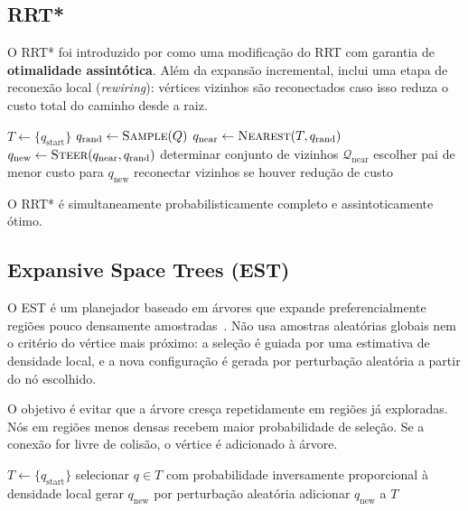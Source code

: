 \subsection{RRT*}

O RRT* foi introduzido por \citet{Karaman2011SamplingbasedAF} como uma modificação do RRT com garantia de \textbf{otimalidade assintótica}. Além da expansão incremental, inclui uma etapa de reconexão local (\textit{rewiring}): vértices vizinhos são reconectados caso isso reduza o custo total do caminho desde a raiz.

\begin{algorithm}[H]
\caption{RRT*}
\begin{algorithmic}[1]
\State $T \gets \{q_{\mathrm{start}}\}$
    \State $q_{\mathrm{rand}} \gets \textsc{Sample}(Q)$
    \State $q_{\mathrm{near}} \gets \textsc{Nearest}(T, q_{\mathrm{rand}})$
    \State $q_{\mathrm{new}} \gets \textsc{Steer}(q_{\mathrm{near}}, q_{\mathrm{rand}})$
        \State determinar conjunto de vizinhos $\mathcal{Q}_{\mathrm{near}}$
        \State escolher pai de menor custo para $q_{\mathrm{new}}$
        \State reconectar vizinhos se houver redução de custo
    \EndIf
\EndWhile
\end{algorithmic}
\end{algorithm}

O RRT* é simultaneamente probabilisticamente completo e assintoticamente ótimo.

\subsection{Expansive Space Trees (EST)}
\label{subsec:est}

O EST é um planejador baseado em árvores que expande preferencialmente regiões pouco densamente amostradas~\cite{choset2005principles}. Não usa amostras aleatórias globais nem o critério do vértice mais próximo: a seleção é guiada por uma estimativa de densidade local, e a nova configuração é gerada por perturbação aleatória a partir do nó escolhido.

O objetivo é evitar que a árvore cresça repetidamente em regiões já exploradas. Nós em regiões menos densas recebem maior probabilidade de seleção. Se a conexão for livre de colisão, o vértice é adicionado à árvore.

\begin{algorithm}[H]
\caption{EST}
\begin{algorithmic}[1]
\State $T \gets \{q_{\mathrm{start}}\}$
    \State selecionar $q \in T$ com probabilidade inversamente proporcional à densidade local
    \State gerar $q_{\mathrm{new}}$ por perturbação aleatória
        \State adicionar $q_{\mathrm{new}}$ a $T$
    \EndIf
\EndWhile
\end{algorithmic}
\end{algorithm}

